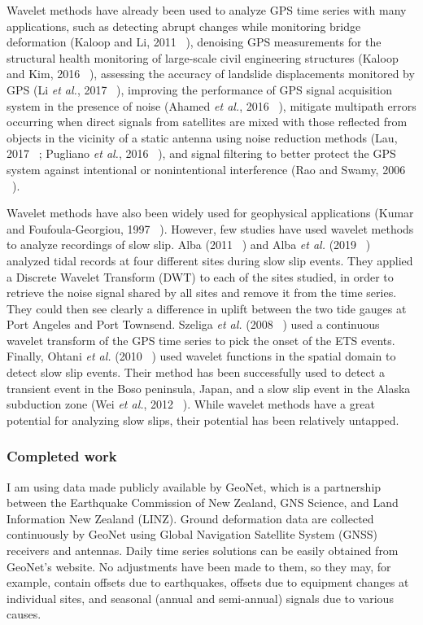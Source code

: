 \documentclass[letterpaper, 12pt]{article}
\begin{document}
Wavelet methods have already been used to analyze GPS time series with many applications, such as detecting abrupt changes while monitoring bridge deformation (Kaloop and Li, 2011 ~\cite{KAL_2011}), denoising GPS measurements for the structural health monitoring of large-scale civil engineering structures (Kaloop and Kim, 2016 ~\cite{KAL_2016}), assessing the accuracy of landslide displacements monitored by GPS (Li \textit{et al.}, 2017 ~\cite{LI_2017}), improving the performance of GPS signal acquisition system in the presence of noise (Ahamed \textit{et al.}, 2016 ~\cite{AHA_2016}), mitigate multipath errors occurring when direct signals from satellites are mixed with those reflected from objects in the vicinity of a static antenna using noise reduction methods (Lau, 2017 ~\cite{LAU_2017}; Pugliano \textit{et al.}, 2016 ~\cite{PUG_2016}), and signal filtering to better protect the GPS system against intentional or nonintentional interference (Rao and Swamy, 2006 ~\cite{RAO_2006}).

Wavelet methods have also been widely used for geophysical applications (Kumar and Foufoula-Georgiou, 1997 ~\cite{KUM_1997}). However, few studies have used wavelet methods to analyze recordings of slow slip. Alba (2011 ~\cite{ALB_2011}) and Alba \textit{et al.} (2019 ~\cite{ALB_2019}) analyzed tidal records at four different sites during slow slip events. They applied a Discrete Wavelet Transform (DWT) to each of the sites studied, in order to retrieve the noise signal shared by all sites and remove it from the time series. They could then see clearly a difference in uplift between the two tide gauges at Port Angeles and Port Townsend. Szeliga \textit{et al.} (2008 ~\cite{SZE_2008}) used a continuous wavelet transform of the GPS time series to pick the onset of the ETS events. Finally, Ohtani \textit{et al.} (2010 ~\cite{OHT_2010}) used wavelet functions in the spatial domain to detect slow slip events. Their method has been successfully used to detect a transient event in the Boso peninsula, Japan, and a slow slip event in the Alaska subduction zone (Wei \textit{et al.}, 2012 ~\cite{WEI_2012}). While wavelet methods have a great potential for analyzing slow slips, their potential has been relatively untapped.

\subsubsection*{Completed work}

I am using data made publicly available by GeoNet, which is a partnership between the Earthquake Commission of New Zealand, GNS Science, and Land Information New Zealand (LINZ). Ground deformation data are collected continuously by GeoNet using Global Navigation Satellite System (GNSS) receivers and antennas. Daily time series solutions can be easily obtained from GeoNet's website. No adjustments have been made to them, so they may, for example, contain offsets due to earthquakes, offsets due to equipment changes at individual sites, and seasonal (annual and semi-annual) signals due to various causes.
\end{document}
